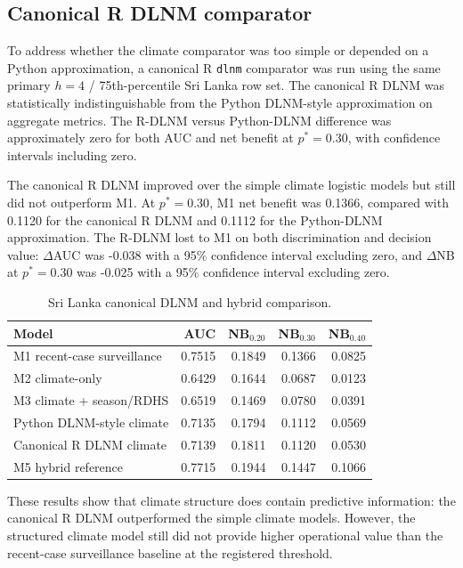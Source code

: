 \documentclass[11pt,a4paper]{article}
\begin{document}
\subsection{Canonical R DLNM comparator}
\label{subsec:canonical-dlnm}

To address whether the climate comparator was too simple or depended on a Python approximation, a canonical R \texttt{dlnm} comparator was run using the same primary $h=4$ / 75th-percentile Sri Lanka row set. The canonical R DLNM was statistically indistinguishable from the Python DLNM-style approximation on aggregate metrics. The R-DLNM versus Python-DLNM difference was approximately zero for both AUC and net benefit at $p^*=0.30$, with confidence intervals including zero.

The canonical R DLNM improved over the simple climate logistic models but still did not outperform M1. At $p^*=0.30$, M1 net benefit was 0.1366, compared with 0.1120 for the canonical R DLNM and 0.1112 for the Python-DLNM approximation. The R-DLNM lost to M1 on both discrimination and decision value: $\Delta$AUC was -0.038 with a 95\% confidence interval excluding zero, and $\Delta$NB at $p^*=0.30$ was -0.025 with a 95\% confidence interval excluding zero.

\begin{table}[htbp]
\centering
\caption{Sri Lanka canonical DLNM and hybrid comparison.}
\label{tab:srilanka-dlnm-hybrid}
\small
\begin{tabular}{lrrrr}
\toprule
Model & AUC & NB$_{0.20}$ & NB$_{0.30}$ & NB$_{0.40}$ \\
\midrule
M1 recent-case surveillance & 0.7515 & 0.1849 & 0.1366 & 0.0825 \\
M2 climate-only & 0.6429 & 0.1644 & 0.0687 & 0.0123 \\
M3 climate + season/RDHS & 0.6519 & 0.1469 & 0.0780 & 0.0391 \\
Python DLNM-style climate & 0.7135 & 0.1794 & 0.1112 & 0.0569 \\
Canonical R DLNM climate & 0.7139 & 0.1811 & 0.1120 & 0.0530 \\
M5 hybrid reference & 0.7715 & 0.1944 & 0.1447 & 0.1066 \\
\bottomrule
\end{tabular}
\end{table}

These results show that climate structure does contain predictive information: the canonical R DLNM outperformed the simple climate models. However, the structured climate model still did not provide higher operational value than the recent-case surveillance baseline at the registered threshold.
\end{document}
